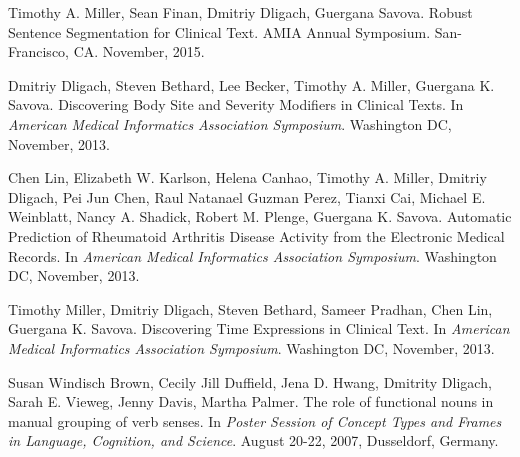 \documentclass[letterpaper]{article}
\renewenvironment{itemize}{
  \begin{list}{}{
    \setlength{\leftmargin}{1.5em}
  }
}{
  \end{list}
}
\begin{document}
\begin{itemize}
\item Timothy A. Miller, Sean Finan, Dmitriy Dligach, Guergana Savova. Robust Sentence Segmentation for Clinical Text. AMIA Annual Symposium. San-Francisco, CA. November, 2015.
\item Dmitriy Dligach, Steven Bethard, Lee Becker, Timothy A. Miller, Guergana K. Savova. Discovering Body Site and Severity Modifiers in Clinical Texts. In \emph{American Medical Informatics Association Symposium}. Washington DC, November, 2013.
\item Chen Lin, Elizabeth W. Karlson, Helena Canhao, Timothy A. Miller, Dmitriy Dligach, Pei Jun Chen, Raul Natanael Guzman Perez, Tianxi Cai, Michael E. Weinblatt, Nancy A. Shadick, Robert M. Plenge, Guergana K. Savova. Automatic Prediction of Rheumatoid Arthritis Disease Activity from the Electronic Medical Records. In \emph{American Medical Informatics Association Symposium}. Washington DC, November, 2013.
\item Timothy Miller, Dmitriy Dligach, Steven Bethard, Sameer Pradhan, Chen Lin, Guergana K. Savova. Discovering Time Expressions in Clinical Text. In \emph{American Medical Informatics Association Symposium}. Washington DC, November, 2013.
\item Susan Windisch Brown, Cecily Jill Duffield, Jena D. Hwang, Dmitrity Dligach, Sarah E. Vieweg, Jenny Davis, Martha Palmer. The role of functional nouns in manual grouping of verb senses. In \emph {Poster Session of Concept Types and Frames in Language, Cognition, and Science}. August 20-22, 2007, Dusseldorf, Germany.
\end{itemize}
\end{document}
